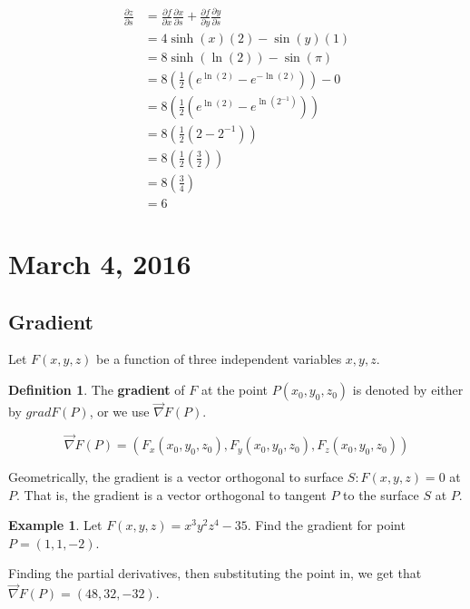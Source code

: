 \documentclass[11pt]{article}
\theoremstyle{plain} %
\theoremstyle{definition}
\newtheorem*{definition}{Definition} %
\theoremstyle{example}
\newtheorem*{example}{Example}
\theoremstyle{remark}
\begin{document}
\begin{align*}
	\frac{\partial z}{\partial s} &= \frac{\partial f}{\partial x}\frac{\partial x}{\partial s} + \frac{\partial f}{\partial y}\frac{\partial y}{\partial s}\\
	&=4\sinh(x)(2)-\sin(y)(1)\\
	&= 8\sinh(\ln(2))-\sin(\pi)\\
	&= 8\left(\frac{1}{2}\left(e^{\ln(2)}-e^{-\ln(2)}\right)\right)-0\\
	&= 8\left(\frac{1}{2}\left(e^{\ln(2)}-e^{\ln(2^{-1})}\right)\right)\\
	&= 8\left(\frac{1}{2}\left(2-2^{-1}\right)\right)\\
	&= 8\left(\frac{1}{2}\left(\frac{3}{2}\right)\right)\\
	&= 8\left(\frac{3}{4}\right)\\
	&=6
\end{align*}














\section{March 4, 2016}

\subsection{Gradient}
Let $F(x,y,z)$ be a function of three independent variables $x,y,z$.
\begin{definition}
The \textbf{gradient} of $F$ at the point $P(x_0, y_0, z_0)$ is denoted by either by $grad F(P)$, or we use $\vec{\nabla} F(P)$.

$$\vec{\nabla} F(P) = (F_x(x_0, y_0, z_0), F_y(x_0, y_0, z_0), F_z(x_0, y_0, z_0))$$

Geometrically, the gradient is a vector orthogonal to surface $S:F(x,y,z) = 0$ at $P$. That is, the gradient is a vector orthogonal to tangent $P$ to the surface $S$ at $P$.
\end{definition}

\begin{example}

Let $F(x, y, z) = x^3y^2z^4-35$. Find the gradient for point $P=(1, 1, -2)$. 
\end{example}Finding the partial derivatives, then substituting the point in, we get that $\vec{\nabla}F(P) = (48, 32, -32)$.
\end{document}
